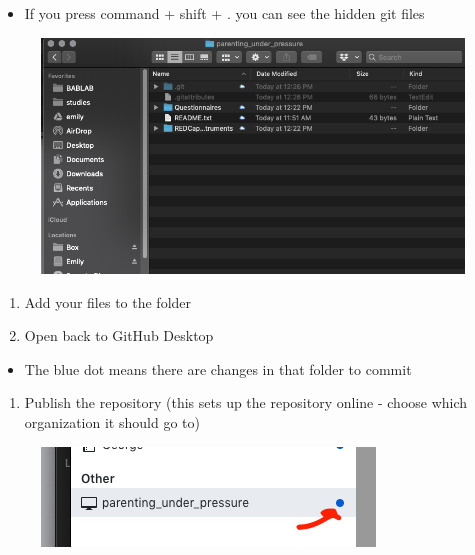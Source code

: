 \documentclass[]{book}
\providecommand{\tightlist}{%
  \setlength{\itemsep}{0pt}\setlength{\parskip}{0pt}}
\begin{document}
\begin{itemize}
\tightlist
\item
  If you press command + shift + . you can see the hidden git files
\end{itemize}

\begin{figure}
\centering
\includegraphics{images/research_protocols/github/5.png}
\caption{}
\end{figure}

\begin{enumerate}
\def\labelenumi{\arabic{enumi}.}
\setcounter{enumi}{3}
\item
  Add your files to the folder
\item
  Open back to GitHub Desktop
\end{enumerate}

\begin{itemize}
\tightlist
\item
  The blue dot means there are changes in that folder to commit
\end{itemize}

\begin{enumerate}
\def\labelenumi{\arabic{enumi}.}
\setcounter{enumi}{5}
\tightlist
\item
  Publish the repository (this sets up the repository online - choose
  which organization it should go to)
\end{enumerate}

\begin{figure}
\centering
\includegraphics{images/research_protocols/github/6.png}
\caption{}
\end{figure}
\end{document}
